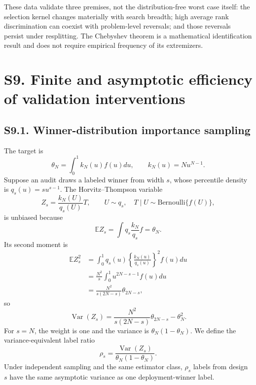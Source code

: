 \documentclass[10pt,twocolumn]{article}
\newcommand{\E}{\mathbb{E}}
\begin{document}
These data validate three premises, not the distribution-free worst case itself: the selection kernel changes materially with search breadth; high average rank discrimination can coexist with problem-level reversals; and those reversals persist under resplitting. The Chebyshev theorem is a mathematical identification result and does not require empirical frequency of its extremizers.

\section*{S9. Finite and asymptotic efficiency of validation interventions}

\subsection*{S9.1. Winner-distribution importance sampling}

The target is
\begin{equation}
\theta_N=\int_0^1k_N(u)f(u)du,
\qquad k_N(u)=Nu^{N-1}.
\label{si:eq:eff-target}
\end{equation}
Suppose an audit draws a labeled winner from width $s$, whose percentile density is $q_s(u)=su^{s-1}$. The Horvitz--Thompson variable
\begin{equation}
Z_s=\frac{k_N(U)}{q_s(U)}T,
\qquad U\sim q_s,\quad T\mid U\sim\mathrm{Bernoulli}\{f(U)\},
\label{si:eq:HT}
\end{equation}
is unbiased because
\begin{equation}
\E Z_s=\int q_s\frac{k_N}{q_s}f=\theta_N.
\label{si:eq:HT-unbiased}
\end{equation}
Its second moment is
\begin{align}
\E Z_s^2
&=\int_0^1q_s(u)\left\{\frac{k_N(u)}{q_s(u)}\right\}^2f(u)du\nonumber\\
&=\frac{N^2}{s}\int_0^1u^{2N-s-1}f(u)du\nonumber\\
&=\frac{N^2}{s(2N-s)}\theta_{2N-s},
\label{si:eq:HT-second}
\end{align}
so
\begin{equation}
\operatorname{Var}(Z_s)
=\frac{N^2}{s(2N-s)}\theta_{2N-s}-\theta_N^2.
\label{si:eq:HT-var}
\end{equation}
For $s=N$, the weight is one and the variance is $\theta_N(1-\theta_N)$. We define the variance-equivalent label ratio
\begin{equation}
\rho_s=\frac{\operatorname{Var}(Z_s)}{\theta_N(1-\theta_N)}.
\label{si:eq:ratio}
\end{equation}
Under independent sampling and the same estimator class, $\rho_s$ labels from design $s$ have the same asymptotic variance as one deployment-winner label.
\end{document}
